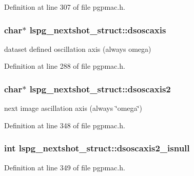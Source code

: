 Definition at line 307 of file pgpmac.\-h.

\hypertarget{structlspg__nextshot__struct_a9a62c304e66013e8e5e5618a44f0b6d4}{
\subsubsection[{dsoscaxis}]{\setlength{\rightskip}{0pt plus 5cm}char$\ast$ lspg\-\_\-nextshot\-\_\-struct\-::dsoscaxis}}\label{structlspg__nextshot__struct_a9a62c304e66013e8e5e5618a44f0b6d4}


dataset defined oscillation axis (always omega) 



Definition at line 288 of file pgpmac.\-h.

\hypertarget{structlspg__nextshot__struct_ac86005a6e90ff502da9e95b59d0b7a5f}{
\subsubsection[{dsoscaxis2}]{\setlength{\rightskip}{0pt plus 5cm}char$\ast$ lspg\-\_\-nextshot\-\_\-struct\-::dsoscaxis2}}\label{structlspg__nextshot__struct_ac86005a6e90ff502da9e95b59d0b7a5f}


next image ascillation axis (always \char`\"{}omega\char`\"{}) 



Definition at line 348 of file pgpmac.\-h.

\hypertarget{structlspg__nextshot__struct_a98e280e99ae847559bb82836df3c32d1}{
\subsubsection[{dsoscaxis2\-\_\-isnull}]{\setlength{\rightskip}{0pt plus 5cm}int lspg\-\_\-nextshot\-\_\-struct\-::dsoscaxis2\-\_\-isnull}}\label{structlspg__nextshot__struct_a98e280e99ae847559bb82836df3c32d1}


Definition at line 349 of file pgpmac.\-h.

